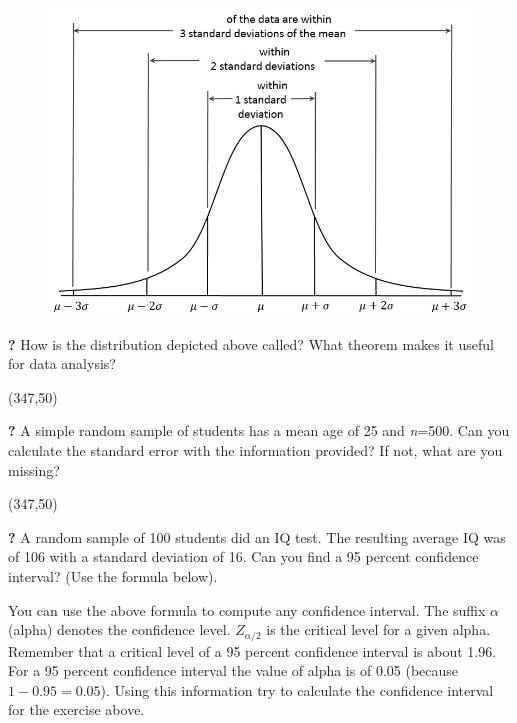 \documentclass{article}
\newcommand{\forceindent}{\leavevmode{\parindent=2em\indent}}
\begin{document}
\begin{figure}[H]
	\includegraphics[width=\linewidth]{../img/gaussian_distribution.jpg}
\end{figure}

\forceindent \textbf{?} How is the distribution depicted above called? What theorem makes it useful for data analysis?

\framebox(347,50){}

\forceindent \textbf{?} A simple random sample of students has a mean age of 25 and \textit{n}=500. Can you calculate the standard error with the information provided? If not, what are you missing?

\framebox(347,50){}

\forceindent \textbf{?} A random sample of 100 students did an IQ test. The resulting average IQ was of 106 with a standard deviation of 16. Can you find a 95 percent confidence interval? (Use the formula below).

\begin{center}
\end{center}

You can use the above formula to compute any confidence interval. The suffix $\alpha$ (alpha) denotes the confidence level. $Z_{\alpha/2}$ is the critical level for a given alpha. Remember that a critical level of a 95 percent confidence interval is about 1.96. For a 95 percent confidence interval the value of alpha is of 0.05 (because $1-0.95=0.05$). Using this information try to calculate the confidence interval for the exercise above.
\end{document}

